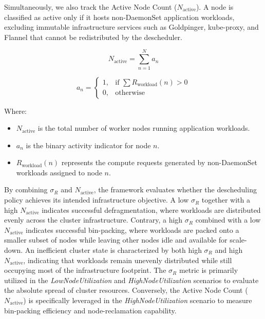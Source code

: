 Simultaneously, we also track the Active Node Count (\(N_{\text{active}}\)). A node is classified as active only if it hosts non-DaemonSet application workloads, excluding immutable infrastructure services such as Goldpinger, kube-proxy, and Flannel that cannot be redistributed by the descheduler.

\[
N_{\text{active}}
=
\sum_{n=1}^{N} a_n
\]

\[
a_n =
\begin{cases}
1, & \text{if } \sum R_{\text{workload}}(n) > 0 \\
0, & \text{otherwise}
\end{cases}
\]

Where:

\begin{itemize}
    \item \(N_{\text{active}}\) is the total number of worker nodes running application workloads.

    \item \(a_n\) is the binary activity indicator for node \(n\).

    \item \(R_{\text{workload}}(n)\) represents the compute requests generated by non-DaemonSet workloads assigned to node \(n\).
\end{itemize}

By combining \(\sigma_R\) and \(N_{\text{active}}\), the framework evaluates whether the descheduling policy achieves its intended infrastructure objective. A low \(\sigma_R\) together with a high \(N_{\text{active}}\) indicates successful defragmentation, where workloads are distributed evenly across the cluster infrastructure. Contrary, a high \(\sigma_R\) combined with a low \(N_{\text{active}}\) indicates successful bin-packing, where workloads are packed onto a smaller subset of nodes while leaving other nodes idle and available for scale-down. An inefficient cluster state is characterized by both high \(\sigma_R\) and high \(N_{\text{active}}\), indicating that workloads remain unevenly distributed while still occupying most of the infrastructure footprint. The \(\sigma_R\) metric is primarily utilized in the \textit{LowNodeUtilization} and \textit{HighNodeUtilization} scenarios to evaluate the absolute spread of cluster resources. Conversely, the Active Node Count (\(N_{\text{active}}\)) is specifically leveraged in the \textit{HighNodeUtilization} scenario to measure bin-packing efficiency and node-reclamation capability.

